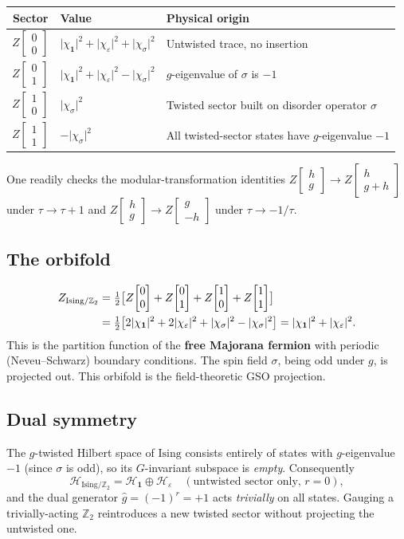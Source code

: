 \documentclass[11pt,a4paper]{article}
\theoremstyle{plain}
\theoremstyle{definition}
\theoremstyle{remark}
\newcommand{\Ztwo}{\mathbb{Z}_2}
\newcommand{\Hil}{\mathcal{H}}
\newcommand{\partfn}[2]{Z\!\begin{bmatrix}#1\\#2\end{bmatrix}}
\newcommand{\abs}[1]{\lvert #1 \rvert}
\begin{document}
\medskip
\begin{center}
\renewcommand{\arraystretch}{1.6}
\begin{tabular}{clp{7cm}}
  \toprule
  Sector & Value & Physical origin \\
  \midrule
  $\partfn{0}{0}$ &
  $\abs{\chi_{\mathbf{1}}}^2+\abs{\chi_\varepsilon}^2+\abs{\chi_\sigma}^2$ &
  Untwisted trace, no insertion \\
  $\partfn{0}{1}$ &
  $\abs{\chi_{\mathbf{1}}}^2+\abs{\chi_\varepsilon}^2-\abs{\chi_\sigma}^2$ &
  $g$-eigenvalue of $\sigma$ is $-1$ \\
  $\partfn{1}{0}$ &
  $\abs{\chi_\sigma}^2$ &
  Twisted sector built on disorder operator $\sigma$ \\
  $\partfn{1}{1}$ &
  $-\abs{\chi_\sigma}^2$ &
  All twisted-sector states have $g$-eigenvalue $-1$ \\
  \bottomrule
\end{tabular}
\end{center}

\medskip
One readily checks the modular-transformation identities
$\partfn{h}{g}\to\partfn{h}{g+h}$ under $\tau\to\tau+1$ and
$\partfn{h}{g}\to\partfn{g}{-h}$ under $\tau\to-1/\tau$.

\subsection{The orbifold}

\begin{align}
  Z_{\mathrm{Ising}/\Ztwo}
  &= \tfrac{1}{2}\bigl[
    \partfn{0}{0}+\partfn{0}{1}+\partfn{1}{0}+\partfn{1}{1}
  \bigr]
  \notag\\
  &= \tfrac{1}{2}\bigl[
    2\abs{\chi_{\mathbf{1}}}^2+2\abs{\chi_\varepsilon}^2
    +\abs{\chi_\sigma}^2-\abs{\chi_\sigma}^2
  \bigr]
  = \abs{\chi_{\mathbf{1}}}^2 + \abs{\chi_\varepsilon}^2.
  \label{eq:IsingOrb}
\end{align}
This is the partition function of the \textbf{free Majorana fermion} with
periodic (Neveu--Schwarz) boundary conditions.  The spin field $\sigma$,
being odd under $g$, is projected out.  This orbifold is the
field-theoretic GSO projection.

\subsection{Dual symmetry}

The $g$-twisted Hilbert space of $\mathrm{Ising}$ consists entirely of
states with $g$-eigenvalue $-1$ (since $\sigma$ is odd), so its
$G$-invariant subspace is \emph{empty}.  Consequently
\[
  \Hil_{\mathrm{Ising}/\Ztwo}
  = \Hil_{\mathbf{1}} \oplus \Hil_\varepsilon
  \quad (\text{untwisted sector only, }r=0),
\]
and the dual generator $\hat{g} = (-1)^r = +1$ acts \emph{trivially}
on all states.  Gauging a trivially-acting $\Ztwo$ reintroduces a
new twisted sector without projecting the untwisted one.
\end{document}
